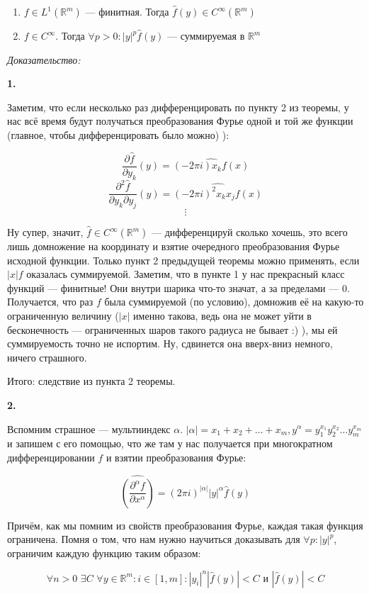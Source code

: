\documentclass{article}
\def\dbl{\,\,}
\begin{document}
\begin{enumerate}
    \item $f \in L^1(\mathbb{R}^m)$ --- финитная. Тогда $\hat{f}(y) \in C^{\infty}(\mathbb{R}^m)$
    \item $f \in C^{\infty}$. Тогда $\forall p > 0: |y|^p \hat{f}(y)$ --- суммируемая в $\mathbb{R}^m$
\end{enumerate}

\textit{Доказательство:}

\textbf{1.}

Заметим, что если несколько раз дифференцировать по пункту 2 из теоремы, у нас всё время будут получаться преобразования Фурье одной и той же функции (главное, чтобы дифференцировать было можно) ):

\[\frac{\partial \hat{f}}{\partial y_k}(y) = \widehat{(-2\pi i)x_kf(x)}\]
\[\frac{\partial^2 \hat{f}}{\partial y_k \partial y_j}(y) = \widehat{(-2\pi i)^2x_kx_jf(x)}\]
\[\vdots\]

Ну супер, значит, $\hat{f} \in C^{\infty}(\mathbb{R}^m)$ --- дифференцируй сколько хочешь, это всего лишь домножение на координату и взятие очередного преобразования Фурье исходной функции. Только пункт 2 предыдущей теоремы можно применять, если $|x| f$ оказалась суммируемой. Заметим, что в пункте 1 у нас прекрасный класс функций --- финитные! Они внутри шарика что-то значат, а за пределами --- 0. Получается, что раз $f$ была суммируемой (по условию), домножив её на какую-то ограниченную величину ($|x|$ именно такова, ведь она не может уйти в бесконечность --- ограниченных шаров такого радиуса не бывает :) ), мы ей суммируемость точно не испортим. Ну, сдвинется она вверх-вниз немного, ничего страшного.

Итого: следствие из пункта 2 теоремы.

\textbf{2.}

Вспомним страшное --- мультииндекс $\alpha$. $|\alpha| = x_1 + x_2 + \ldots + x_m, y^\alpha = y_1^{x_1}y_2^{x_2}\ldots y_m^{x_m}$ и запишем с его помощью, что же там у нас получается при многократном дифференцировании $f$ и взятии преобразования Фурье:

\[\widehat{\left(\frac{\partial^\alpha f}{\partial x^\alpha}\right)} = (2\pi i)^{|\alpha|} |y|^{\alpha} \hat{f}(y)\]

Причём, как мы помним из свойств преобразования Фурье, каждая такая функция ограничена. Помня о том, что нам нужно научиться доказывать для $\forall p : |y|^p$, ограничим каждую функцию таким образом:

\[\forall n > 0 \dbl \exists C \dbl \forall y \in \mathbb{R}^m: i \in [1, m]: |y_i|^n|\hat{f}(y)| < C \text{ и } |\hat{f}(y)| < C\]
\end{document}
